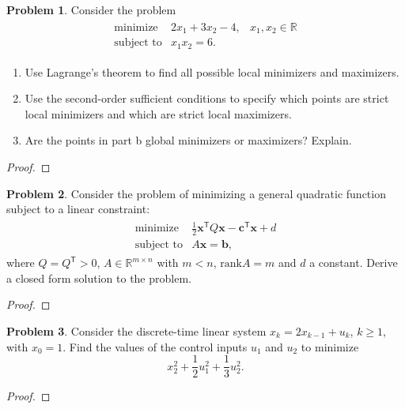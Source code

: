 \documentclass[12pt]{article}
\theoremstyle{definition}
\newtheorem{problem}{Problem}
\newcommand{\vc}[1]{\boldsymbol{#1}}
\newcommand{\tran}{\mathsf{T}}
\begin{document}
\begin{problem}
  Consider the problem
  \begin{align*}
    \begin{array}{rll}
      \text{minimize} & 2x_1 + 3x_2 - 4, & x_1, x_2 \in \mathbb{R} \\
      \text{subject to} & x_1 x_2 = 6.&
    \end{array}
  \end{align*}

  \begin{enumerate}
    \item Use Lagrange's theorem to find all possible local minimizers and maximizers.
    \item Use the second-order sufficient conditions to specify which points are strict
      local minimizers and which are strict local maximizers.
    \item Are the points in part b global minimizers or maximizers? Explain.
  \end{enumerate}
\end{problem}

\begin{proof}
\end{proof}
\newpage


\begin{problem}
  Consider the problem of minimizing a general quadratic function subject to a linear constraint:
  \begin{align*}
    \begin{array}{rl}
      \text{minimize} & \frac{1}{2} \vc{x}^\tran Q \vc{x} - \vc{c}^\tran \vc{x} + d\\
      \text{subject to} & A\vc{x} = \vc{b},
    \end{array}
  \end{align*}
  where $Q=Q^\tran > 0$, $A \in\mathbb{R}^{m \times n}$ with $m<n$, $\text{rank} A = m$ and $d$ a constant.
  Derive a closed form solution to the problem.
\end{problem}

\begin{proof}
\end{proof}
\newpage


\begin{problem}
  Consider the discrete-time linear system $x_k = 2 x_{k-1} + u_k$, $k \geq 1$, with
  $x_0 = 1$. Find the values of the control inputs $u_1$ and $u_2$ to minimize
  $$x_2^2 + \frac{1}{2}u_1^2+ \frac{1}{3}u_2^2.$$
\end{problem}

\begin{proof}
\end{proof}
\end{document}
